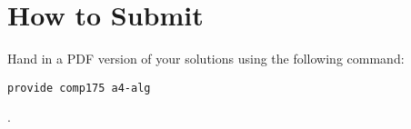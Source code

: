 \documentclass[10pt,twocolumn]{article}
\begin{document}
\section{How to Submit}

Hand in a PDF version of your solutions using the following command:
\begin{center}
 {\tt provide comp175 a4-alg}
\end{center}
.\\\\\\\\\\\\\\\\\\\\\\\\
\end{document}

